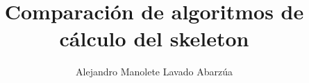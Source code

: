 \documentclass[spanish,letterpaper]{templates/uchile-tesis}
\title{Comparación de algoritmos de cálculo del skeleton}
\author{Alejandro Manolete Lavado Abarzúa}
\begin{document}
\listoftodos
\newpage

\maketitle















\end{document}
